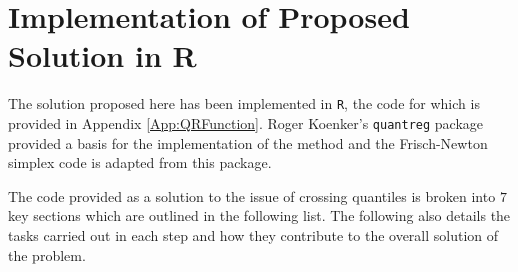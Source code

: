 \documentclass[12pt,a4paper]{report}
\begin{document}
\section{Implementation of Proposed Solution in R}
The solution proposed here has been implemented in {\small{\verb"R"}}, the code for which is provided in Appendix \ref{App:QRFunction}. Roger Koenker's {\small{\verb"quantreg"}} package provided a basis for the implementation of the method and the Frisch-Newton simplex code is adapted from this package. \vspace{2mm}

The code provided as a solution to the issue of crossing quantiles is broken into $7$ key sections which are outlined in the following list. The following also details the tasks carried out in each step and how they contribute to the overall solution of the problem.
\end{document}
